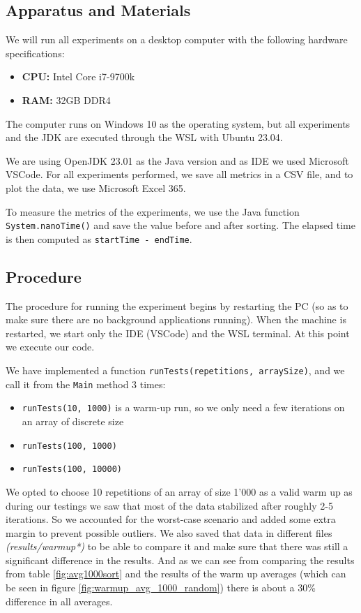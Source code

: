 \documentclass{article}
\begin{document}
\FloatBarrier

\subsection{Apparatus and Materials}
We will run all experiments on a desktop computer with the following hardware specifications:
\begin{itemize}
    \item \textbf{CPU:} Intel Core i7-9700k
    \item \textbf{RAM:} 32GB DDR4
\end{itemize}

The computer runs on Windows 10 as the operating system, but all experiments and the JDK are executed through the WSL with Ubuntu 23.04.

We are using OpenJDK 23.01 as the Java version and as IDE we used Microsoft VSCode. For all experiments performed, we save all metrics in a CSV file, and to plot the data, we use Microsoft Excel 365.

To measure the metrics of the experiments, we use the Java function \texttt{System.nanoTime()} and save the value before and after sorting. The elapsed time is then computed as \texttt{startTime - endTime}.

\subsection{Procedure}
The procedure for running the experiment begins by restarting the PC (so as to make sure there are no background applications running). When the machine is restarted, we start only the IDE (VSCode) and the WSL terminal. At this point we execute our code.

We have implemented a function \texttt{runTests(repetitions, arraySize)}, and we call it from the \texttt{Main} method 3 times:
\begin{itemize}
    \item \texttt{runTests(10, 1000)} is a warm-up run, so we only need a few iterations on an array of discrete size
    \item \texttt{runTests(100, 1000)}
    \item \texttt{runTests(100, 10000)}
\end{itemize}

We opted to choose 10 repetitions of an array of size 1'000 as a valid warm up as during our testings we saw that most of the data stabilized after roughly 2-5 iterations. So we accounted for the worst-case scenario and added some extra margin to prevent possible outliers. We also saved that data in different files \textit{(results/warmup*)} to be able to compare it and make sure that there was still a significant difference in the results. And as we can see from comparing the results from table \ref{fig:avg1000sort} and the results of the warm up averages (which can be seen in figure \ref{fig:warmup_avg_1000_random}) there is about a 30\% difference in all averages.
\end{document}
